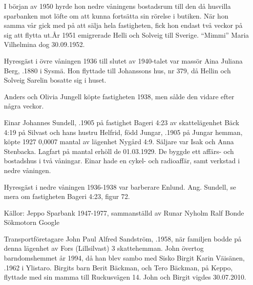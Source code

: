 I början av 1950 hyrde hon nedre våningens bostadsrum till den då husvilla sparbanken mot löfte om att kunna fortsätta sin rörelse i butiken. När hon samma vår gick med på att sälja hela fastigheten, fick hon endast två veckor på sig att flytta ut.År 1951 emigrerade Helli och Solveig till Sverige. ``Mimmi'' Maria Vilhelmina dog 30.09.1952.

Hyresgäst i övre våningen 1936 till slutet av 1940-talet var massör	Aina Juliana Berg, .1880 i Sysmä. Hon flyttade till Johanssons hus, nr 379, då Hellin och Solveig Sarelin bosatte sig i huset.


Anders och Olivia Jungell köpte fastigheten 1938, men sålde den vidare	efter några veckor.



Einar Johannes Sundell, .1905 på fastighet Bageri 4:23 av 	skattelägenhet Bäck 4:19 på Silvast och hans hustru Helfrid, född Jungar, .1905 på Jungar hemman, köpte 1927 0,0007 mantal av lägenhet Nygård 4:9. Säljare var Isak och Anna Stenbacka. Lagfart på mantal erhöll de 01.03.1929. De byggde ett affärs- och bostadshus i två våningar. Einar hade en cykel- och radioaffär, samt verkstad i nedre våningen.

Hyresgäst i nedre våningen 1936-1938 var barberare Enlund.
Ang. Sundell, se mera om fastigheten Bageri 4:23, figur 72.




Källor:
Jeppo Sparbank 1947-1977, sammanställd av Runar Nyholm
Ralf Bonde
Sökmotorn Google



Transportföretagare John Paul Alfred Sandström, .1958, när familjen bodde på denna lägenhet av Fors (Lillsilvast) 3 skattehemman. John övertog barndomshemmet år 1994, då han blev sambo med Sisko Birgit Karin Väisänen, .1962 i Ylistaro. Birgits barn Berit Bäckman,  och Tero Bäckman,  på Keppo, flyttade med sin mamma till Ruckusvägen 14. John och Birgit vigdes 30.07.2010.
\begin{jhchildren}
  \item {}
  \item {}
\end{jhchildren}


